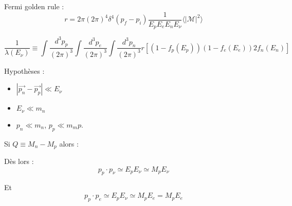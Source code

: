 \documentclass[11pt]{article} %
\begin{document}
Fermi golden rule :
\begin{equation}
r = 2\pi (2\pi)^4 \delta^4 (p_f-p_i) \dfrac{1}{E_p E_e E_n E_\nu} \langle |\mathcal{M}|^2 \rangle
\end{equation}

\begin{equation}
\dfrac{1}{\lambda (E_\nu)} \equiv \int \dfrac{d^3 p_p}{(2\pi)^3} \int \dfrac{d^3 p_e}{(2\pi)^3} \int \dfrac{d^3 p_n}{(2\pi)^3} r \left [ (1-f_p(E_p))(1-f_e(E_e))2f_n(E_n)\right ]
\end{equation}

Hypothèses :
\begin{itemize}
\item $|\vec{p_n}-\vec{p_p}| \ll E_\nu$
\item $E_\nu \ll m_n$
\item $p_n \ll m_n$, $p_p \ll m_mp$.
\end{itemize}

Si $Q \equiv M_n-M_p$ alors :

Dès lors :
\begin{equation}
p_p \cdot p_\nu \simeq E_p E_\nu \simeq M_p E_\nu
\end{equation}

Et
\begin{equation}
p_p \cdot p_e \simeq E_p E_\nu \simeq M_p E_e = M_p E_e
\end{equation}
\end{document}
